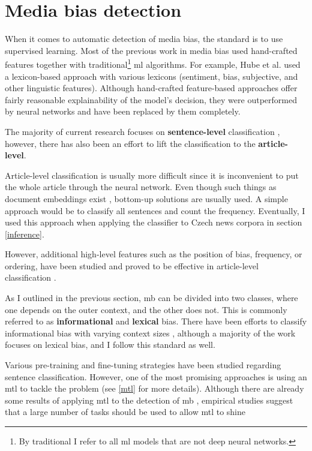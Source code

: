 \section{Media bias detection}\label{mediabias}
When it comes to automatic detection of media bias, the standard is to use supervised learning. Most of the previous work in media bias used hand-crafted features together with traditional\footnote{By traditional I refer to all \Gls{ml} models that are not deep neural networks.} \Gls{ml} algorithms. For example, Hube et al. \cite{hube2018detecting} used a lexicon-based approach with various lexicons (sentiment, bias, subjective, and other linguistic features). Although hand-crafted feature-based approaches offer fairly reasonable explainability of the model's decision, they were outperformed by neural networks and have been replaced by them completely.

The majority of current research focuses on \textbf{sentence-level} classification \cite{sinha2021determining,Spinde2021MBIC,lee2021unifying,hube2019neural}, however, there has also been an effort to lift the classification to the \textbf{article-level}.

Article-level classification is usually more difficult since it is inconvenient to put the whole article through the neural network. Even though such things as document embeddings exist \cite{lau2016empirical}, bottom-up solutions are usually used. A simple approach would be to classify all sentences and count the frequency. Eventually, I used this approach when applying the classifier to Czech news corpora in section \ref{inference}.

However, additional high-level features such as the position of bias, frequency, or ordering, have been studied and proved to be effective in article-level classification \cite{chen2020detecting,chen-etal-2020-analyzing}.

As I outlined in the previous section, \gls{mb} can be divided into two classes, where one depends on the outer context, and the other does not. This is commonly referred to as \textbf{informational} and \textbf{lexical} bias. There have been efforts to classify informational bias with varying context sizes \cite{van2020context}, although a majority of the work focuses on lexical bias, and I follow this standard as well.

Various pre-training and fine-tuning strategies have been studied regarding sentence classification. However, one of the most promising approaches is using an \Gls{mtl} to tackle the problem (see \ref{mtl} for more details). Although there are already some results of applying \Gls{mtl} to the detection of \gls{mb} \cite{lee2021unifying,spindeexploiting}, empirical studies suggest that a large number of tasks should be used to allow \Gls{mtl} to shine \cite{aribandi2021ext5}

\let\cleardoublepage\clearpage
